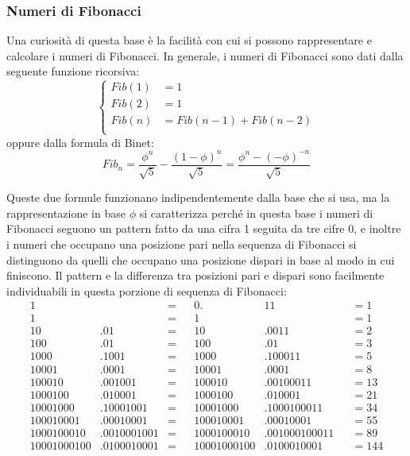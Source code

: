 \documentclass[Lau]{sapthesis}
\begin{document}
\subsubsection{Numeri di Fibonacci}
Una curiosità di questa base è la facilità con cui si possono rappresentare e calcolare i numeri di Fibonacci. In generale, i numeri di Fibonacci sono dati dalla seguente funzione ricorsiva:
\begin{equation*}
\left\{
\begin{aligned}
Fib(1) & = 1\\
Fib(2) & = 1\\
Fib(n) & = Fib(n-1) + Fib(n-2)\\
\end{aligned}
\right.
\end{equation*}
oppure dalla formula di Binet:
$$Fib_n = \frac{\phi^n}{\sqrt{5}} - \frac{\left(1 - \phi\right)^n}{\sqrt{5}} = \frac{\phi^n - (-\phi)^{-n}}{\sqrt{5}}$$

Queste due formule funzionano indipendentemente dalla base che si usa, ma la rappresentazione in base $\phi$ si caratterizza perché in questa base i numeri di Fibonacci seguono un pattern fatto da una cifra 1 seguita da tre cifre 0, e inoltre i numeri che occupano una posizione pari nella sequenza di Fibonacci si distinguono da quelli che occupano una posizione dispari in base al modo in cui finiscono. Il pattern e la differenza tra posizioni pari e dispari sono facilmente individuabili in questa porzione di sequenza di Fibonacci:
\begin{align*}
1& & = & & 0.&11 & & = 1 \tag{1}\\
1& & = & & 1& & & = 1 \tag{2}\\
10&.01 & = & & 10&.0011 & & = 2 \tag{3}\\
100&.01 & = & & 100&.01 & & = 3 \tag{4}\\
1000&.1001 & = & & 1000&.100011 & & = 5 \tag{5}\\
10001&.0001 & = & & 10001&.0001 & & = 8 \tag{6}\\
100010&.001001 & = & & 100010&.00100011 & & = 13 \tag{7}\\
1000100&.010001 & = & & 1000100&.010001 & & = 21 \tag{8}\\
10001000&.10001001 & = & & 10001000&.1000100011 & & = 34 \tag{9}\\
100010001&.00010001 & = & & 100010001&.00010001 & & = 55 \tag{10}\\
1000100010&.0010001001 & = & & 1000100010&.001000100011 & & = 89 \tag{11}\\
10001000100&.0100010001 & = & & 10001000100&.0100010001 & & = 144 \tag{12}
\end{align*}
\end{document}
